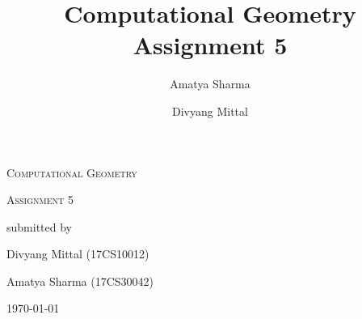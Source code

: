 \documentclass[10pt,english]{article}
\title{Computational Geometry Assignment 5}
\author{Amatya Sharma \and Divyang Mittal}
\begin{document}
\begin{titlepage}
	\centering
	\vspace{4cm}
	{\scshape\LARGE Computational Geometry \par}
	\vspace{1cm}
	{\scshape\Large Assignment 5\par}

	\vfill
	submitted by\par
	Divyang Mittal (17CS10012) \par
	Amatya Sharma (17CS30042)

	\vfill

	{\large \today\par}
\end{titlepage}

\tableofcontents




\ifdefined\DEBUG
% 
\fi 


\newpage


\newpage





\end{document}
